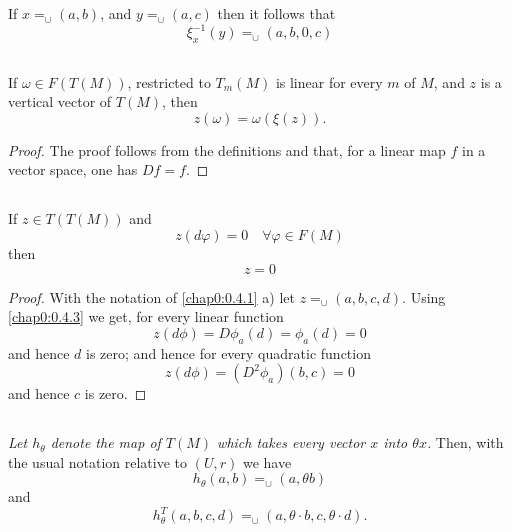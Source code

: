 \setcounter{subsection}{14}
\subsection{}\label{chap0:0.4.15}

If $x{\displaystyle{\mathop{=}_{\cup}}}(a,b)$, and
$y{\displaystyle{\mathop{=}_{\cup}}}(a,c)$ then it follows that
$$
\xi^{-1}_{x}(y)\mathop{=}_{\cup}(a,b,0,c)
$$


\setcounter{subsection}{15}
\subsection{}\label{chap0:0.4.16}

\begin{lemma*}
If $\omega\in F(T(M))$, restricted to $T_{m}(M)$ is linear for every
$m$ of $M$, and $z$ is a vertical vector of $T(M)$, then
$$
z(\omega)=\omega(\xi(z)).
$$
\end{lemma*}

\begin{proof}
The proof follows from the definitions and that, for a linear map $f$
in a vector space, one has $Df=f$.
\end{proof}

\subsection{}\label{chap0:0.4.17}

\begin{lemma*}
If $z\in T(T(M))$ and 
$$
z(d\varphi)=0\quad \forall \varphi\in F(M)
$$\pageoriginale
then
$$
z=0
$$
\end{lemma*}

\begin{proof}
With the notation of \ref{chap0:0.4.1} a) let
$z{\displaystyle{\mathop{=}_{\cup}}}(a,b,c,d)$. Using \ref{chap0:0.4.3}
we get, for every linear function
$$
z(d\phi)=D\phi_{a}(d)=\phi_{a}(d)=0
$$ 
and hence $d$ is zero; and hence for every quadratic function
$$
z(d\phi)=(D^{2}\phi_{a})(b,c)=0
$$
and hence $c$ is zero.
\end{proof}

\setcounter{subsection}{17}
\subsection{}\label{chap0:0.4.18}

{\em Let $h_{\theta}$ denote the map of $T(M)$ which takes every
vector $x$ into $\theta x$.} Then, with the usual notation relative to
$(U,r)$ we have
$$
h_{\theta}(a,b)\mathop{=}_{\cup}(a,\theta b)
$$
and
$$
h^{T}_{\theta}(a,b,c,d)\mathop{=}_{\cup}(a,\theta\cdot
b,c,\theta\cdot d).
$$

